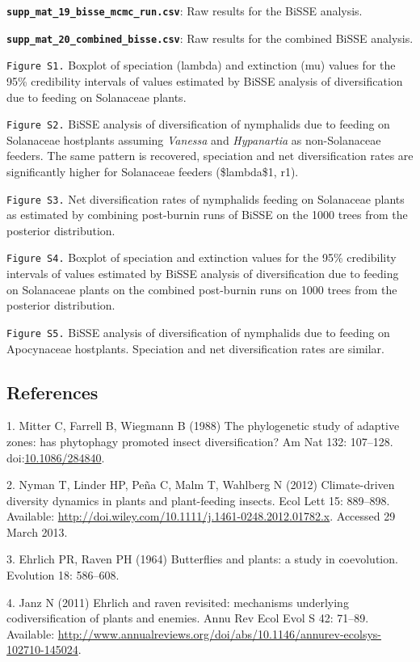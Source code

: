 \documentclass[10pt]{article}
\begin{document}
\textbf{\texttt{supp\_mat\_19\_bisse\_mcmc\_run.csv}}: Raw results for
the BiSSE analysis.

\textbf{\texttt{supp\_mat\_20\_combined\_bisse.csv}}: Raw results for
the combined BiSSE analysis.

\texttt{Figure S1.} Boxplot of speciation (lambda) and extinction (mu)
values for the 95\% credibility intervals of values estimated by BiSSE
analysis of diversification due to feeding on Solanaceae plants.

\texttt{Figure S2.} BiSSE analysis of diversification of nymphalids due
to feeding on Solanaceae hostplants assuming \emph{Vanessa} and
\emph{Hypanartia} as non-Solanaceae feeders. The same pattern is
recovered, speciation and net diversification rates are significantly
higher for Solanaceae feeders (\$lambda\$1, r1).

\texttt{Figure S3.} Net diversification rates of nymphalids feeding on
Solanaceae plants as estimated by combining post-burnin runs of BiSSE on
the 1000 trees from the posterior distribution.

\texttt{Figure S4.} Boxplot of speciation and extinction values for the
95\% credibility intervals of values estimated by BiSSE analysis of
diversification due to feeding on Solanaceae plants on the combined
post-burnin runs on 1000 trees from the posterior distribution.

\texttt{Figure S5.} BiSSE analysis of diversification of nymphalids due
to feeding on Apocynaceae hostplants. Speciation and net diversification
rates are similar.

\subsection{References}\label{references}

1. Mitter C, Farrell B, Wiegmann B (1988) The phylogenetic study of
adaptive zones: has phytophagy promoted insect diversification? Am Nat
132: 107--128.
doi:\href{http://dx.doi.org/10.1086/284840}{10.1086/284840}.

2. Nyman T, Linder HP, Peña C, Malm T, Wahlberg N (2012) Climate-driven
diversity dynamics in plants and plant-feeding insects. Ecol Lett 15:
889--898. Available:
\url{http://doi.wiley.com/10.1111/j.1461-0248.2012.01782.x}. Accessed 29
March 2013.

3. Ehrlich PR, Raven PH (1964) Butterflies and plants: a study in
coevolution. Evolution 18: 586--608.

4. Janz N (2011) Ehrlich and raven revisited: mechanisms underlying
codiversification of plants and enemies. Annu Rev Ecol Evol S 42:
71--89. Available:
\url{http://www.annualreviews.org/doi/abs/10.1146/annurev-ecolsys-102710-145024}.
\end{document}
